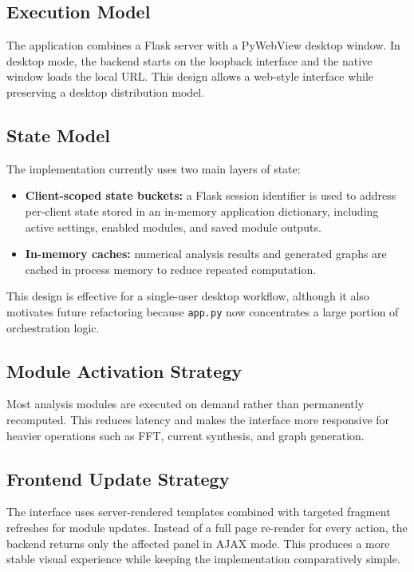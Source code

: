 \documentclass[conference]{IEEEtran}
\begin{document}
\subsection{Execution Model}
The application combines a Flask server with a PyWebView desktop window. In desktop mode, the backend starts on the loopback interface and the native window loads the local URL. This design allows a web-style interface while preserving a desktop distribution model.

\subsection{State Model}
The implementation currently uses two main layers of state:

\begin{itemize}
    \item \textbf{Client-scoped state buckets:} a Flask session identifier is used to address per-client state stored in an in-memory application dictionary, including active settings, enabled modules, and saved module outputs.
    \item \textbf{In-memory caches:} numerical analysis results and generated graphs are cached in process memory to reduce repeated computation.
\end{itemize}

This design is effective for a single-user desktop workflow, although it also motivates future refactoring because \texttt{app.py} now concentrates a large portion of orchestration logic.

\subsection{Module Activation Strategy}
Most analysis modules are executed on demand rather than permanently recomputed. This reduces latency and makes the interface more responsive for heavier operations such as FFT, current synthesis, and graph generation.

\subsection{Frontend Update Strategy}
The interface uses server-rendered templates combined with targeted fragment refreshes for module updates. Instead of a full page re-render for every action, the backend returns only the affected panel in AJAX mode. This produces a more stable visual experience while keeping the implementation comparatively simple.
\end{document}
